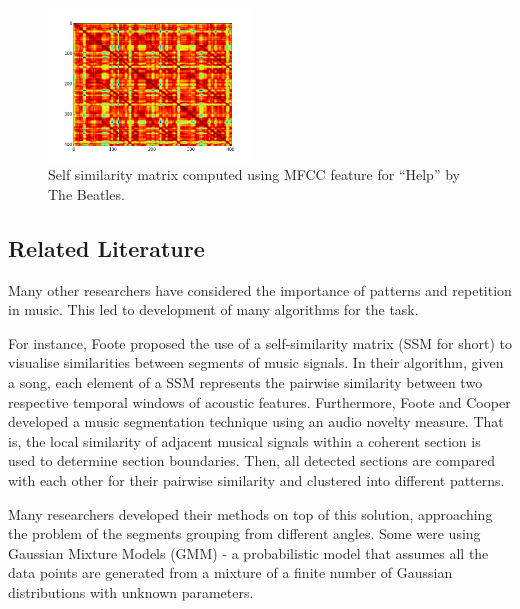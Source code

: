 \begin{figure}
  \vspace{-80pt}

  \begin{center}
    \includegraphics[width=0.48\textwidth]{Figures/mfcc_no_log_sync}
  \end{center}
  \caption{Self similarity matrix computed using MFCC feature for ``Help'' by The Beatles.}
  \label{fig:SSMbach}
\end{figure}


\vspace{10pt}

\subsection{Related Literature}

Many other researchers have considered the importance of patterns and repetition in music. This led to development of many algorithms for the task.

For instance, Foote \cite{Foote} proposed the use of a self-similarity matrix (SSM for short) to visualise similarities between segments of music signals. In their algorithm, given a song, each element of a SSM represents the pairwise similarity between two respective temporal windows of acoustic features. Furthermore, Foote and Cooper \cite{FooteCooper} developed a music segmentation technique using an audio novelty measure. That is, the local similarity of adjacent musical signals within a coherent section is used to determine section boundaries. Then, all detected sections are compared with each other for their pairwise similarity and clustered into different patterns.

Many researchers developed their methods on top of this solution, approaching the problem of the segments grouping from different angles. Some were using Gaussian Mixture Models (GMM) - a probabilistic model that assumes all the data points are generated from a mixture of a finite number of Gaussian distributions with unknown parameters. 

